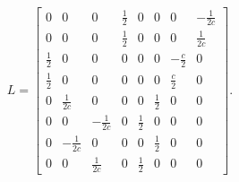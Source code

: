 \documentclass[11pt, reqno]{amsart}
\theoremstyle{definition}
\begin{document}
\begin{align}
  L
  =
  \left[
    \begin{matrix}
      0 & 0 & 0 & \frac{1}{2} & 0 & 0 & 0 & -\frac{1}{2c} \\
      0 & 0 & 0 & \frac{1}{2} & 0 & 0 & 0 & \frac{1}{2c} \\
      \frac{1}{2} & 0 & 0 & 0 & 0 & 0 & -\frac{c}{2} & 0 \\
      \frac{1}{2} & 0 & 0 & 0 & 0 & 0 & \frac{c}{2} & 0 \\
      0 & \frac{1}{2c} & 0 & 0 & 0 & \frac{1}{2} & 0 & 0 \\
      0 & 0 & -\frac{1}{2c} & 0 & \frac{1}{2} & 0 & 0 & 0 \\
      0 & -\frac{1}{2c} & 0 & 0 & 0 & \frac{1}{2} & 0 & 0 \\
      0 & 0 & \frac{1}{2c} & 0 & \frac{1}{2} & 0 & 0 & 0
    \end{matrix}
  \right].
  \label{eq:ph_lev}
\end{align}
\end{document}
